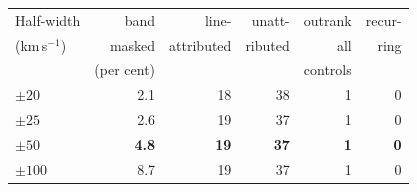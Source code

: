 \begin{tabular}{@{}lrrrrr@{}}
\hline
Half-width & band & line- & unatt- & outrank & recur- \\
(km\,s$^{-1}$) & masked & attributed & ributed & all & ring \\
 & (per cent) & & & controls & \\
\hline
$\pm20$ & 2.1 & 18 & 38 & 1 & 0 \\
$\pm25$ & 2.6 & 19 & 37 & 1 & 0 \\
\textbf{$\pm50$} & \textbf{4.8} & \textbf{19} & \textbf{37} & \textbf{1} & \textbf{0} \\
$\pm100$ & 8.7 & 19 & 37 & 1 & 0 \\
\hline
\end{tabular}
